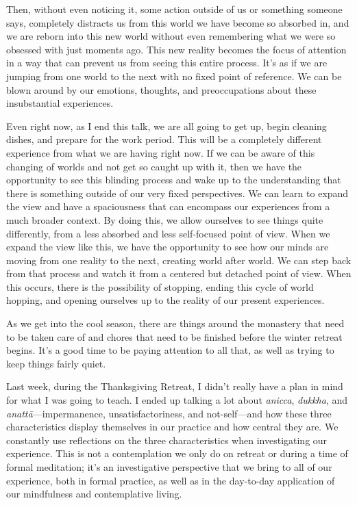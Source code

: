 Then, without even noticing it, some action outside of us or something 
someone says, completely distracts us from this world we have become so 
absorbed in, and we are reborn into this new world without even 
remembering what we were so obsessed with just moments ago. This new 
reality becomes the focus of attention in a way that can prevent us 
from seeing this entire process. It's as if we are jumping from one 
world to the next with no fixed point of reference. We can be blown 
around by our emotions, thoughts, and preoccupations about these 
insubstantial experiences.

Even right now, as I end this talk, we are all going to get up, begin 
cleaning dishes, and prepare for the work period. This will be a 
completely different experience from what we are having right now. If 
we can be aware of this changing of worlds and not get so caught up 
with it, then we have the opportunity to see this blinding process and 
wake up to the understanding that there is something outside of our 
very fixed perspectives. We can learn to expand the view and have a 
spaciousness that can encompass our experiences from a much broader 
context. By doing this, we allow ourselves to see things quite 
differently, from a less absorbed and less self-focused point of view. 
When we expand the view like this, we have the opportunity to see how 
our minds are moving from one reality to the next, creating world after 
world. We can step back from that process and watch it from a centered 
but detached point of view. When this occurs, there is the possibility 
of stopping, ending this cycle of world hopping, and opening ourselves 
up to the reality of our present experiences.


As we get into the cool season, there are things around the monastery 
that need to be taken care of and chores that need to be finished 
before the winter retreat begins. It's a good time to be paying 
attention to all that, as well as trying to keep things fairly quiet.

Last week, during the Thanksgiving Retreat, I didn't really have a plan 
in mind for what I was going to teach. I ended up talking a lot about 
\emph{anicca}, \emph{dukkha}, and \emph{anattā}---impermanence, 
unsatisfactoriness, and not-self---and how these three characteristics 
display themselves in our practice and how central they are. We 
constantly use reflections on the three characteristics when 
investigating our experience. This is not a contemplation we only do on 
retreat or during a time of formal meditation; it's an investigative 
perspective that we bring to all of our experience, both in formal 
practice, as well as in the day-to-day application of our mindfulness 
and contemplative living.

